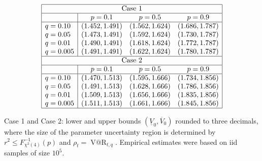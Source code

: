 \documentclass[11pt,a4paper]{article}
\makeatletter
\newcommand{\VaR}{\operatorname{V@R}}
\makeatother
\begin{document}
\begin{table}[!ht]
\[\begin{array}{|l|ccc|}\hline
\multicolumn{4}{|c|}{\text{Case 1}} \\ \hline
& p=0.1 & p=0.5 & p=0.9 \\ \hline
q=0.10 & (1.452,1.491) & (1.562,1.624) & (1.686,1.787) \\
q=0.05 & (1.473,1.491) & (1.592,1.624) & (1.730,1.787) \\
q=0.01 & (1.490,1.491) & (1.618,1.624) & (1.772,1.787) \\
q=0.005 & (1.491,1.491) & (1.622,1.624) & (1.780,1.787) \\  \hline 
\multicolumn{4}{|c|}{\text{Case 2}} \\ \hline
& p=0.1 & p=0.5 & p=0.9 \\ \hline
q=0.10 & (1.470,1.513) & (1.595,1.666) & (1.734,1.856) \\
q=0.05 & (1.491,1.513) & (1.628,1.666) & (1.786,1.856) \\
q=0.01 & (1.509,1.513) & (1.656,1.666) & (1.835,1.856) \\
q=0.005 & (1.511,1.513) & (1.661,1.666) & (1.845,1.856) \\  \hline 
\end{array} \]
\caption{Case 1 and Case 2: lower and upper bounds $(\underline{V}_0,\overline{V}_0)$ rounded to three decimals, where the size of the parameter uncertainty region is determined by $r^2\leq F_{\chi^2(4)}^{-1}(p)$ and $\rho_t=\VaR_{t,q}$. Empirical estimates were based on iid samples of size $10^5$.}
\label{tab:V0lowerupperbounds}
\end{table}
\end{document}
